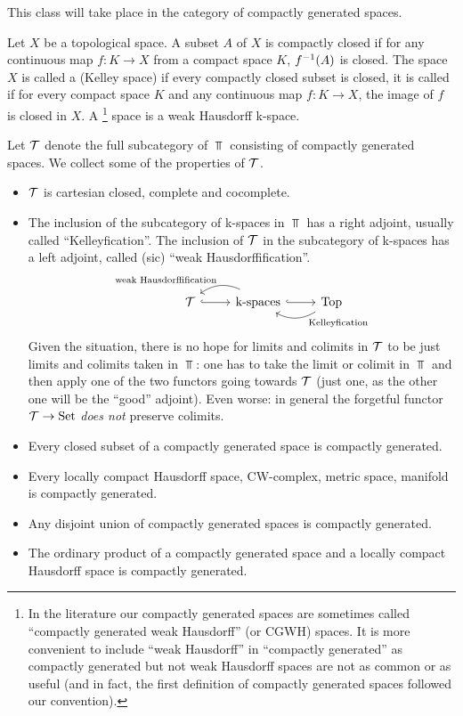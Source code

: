 \begin{remark!}
This class will take place in the category of compactly generated spaces.

Let $X$ be a topological space. A subset $A$ of $X$ is compactly closed if for any continuous map $f:K\to X$ from a compact space $K$, $f^{-1}(A)$ is closed. The space $X$ is called a  (Kelley space) if every compactly closed subset is closed, it is called  if for every compact space $K$ and any continuous map $f:K\to X$, the image of $f$ is closed in $X$. A \footnote{In the literature our compactly generated spaces are sometimes called \enquote{compactly generated weak Hausdorff} (or CGWH) spaces. It is more convenient to include \enquote{weak Hausdorff} in \enquote{compactly generated} as compactly generated but not weak Hausdorff spaces are not as common or as useful (and in fact, the first definition of compactly generated spaces followed our convention).} space is a weak Hausdorff k-space.

Let $\mathcal{T}$ denote the full subcategory of $\Top$ consisting of compactly generated spaces. We collect some of the properties of $\mathcal{T}$.
\begin{itemize}
    \item $\mathcal{T}$ is cartesian closed, complete and cocomplete.
    \item The inclusion of the subcategory of k-spaces in $\Top$ has a right adjoint, usually called \enquote{Kelleyfication}. The inclusion of $\mathcal{T}$ in the subcategory of k-spaces has a left adjoint, called (sic) \enquote{weak Hausdorffification}.
    \[\begin{tikzcd}
    \T \ar[r,hook] & \operatorname{k-spaces} \ar[r,hook] \ar[l,bend right,shift right,"\text{weak Hausdorffification}"'] & \Top \ar[l,bend left,"\text{Kelleyfication}",near start]
    \end{tikzcd}\]
    Given the situation, there is no hope for limits and colimits in $\mathcal{T}$ to be just limits and colimits taken in $\Top$: one has to take the limit or colimit in $\Top$ and then apply one of the two functors going towards $\mathcal{T}$ (just one, as the other one will be the \enquote{good} adjoint). Even worse: in general the forgetful functor $\mathcal{T}\to{\normalfont\textup{Set}}$ \emph{does not} preserve colimits.
    \item Every closed subset of a compactly generated space is compactly generated.
    \item Every locally compact Hausdorff space, CW-complex, metric space, manifold is compactly generated.
    \item Any disjoint union of compactly generated spaces is compactly generated.
    \item The ordinary product of a compactly generated space and a locally compact Hausdorff space is compactly generated.
\end{itemize}
\vspace{5em}
\end{remark!}

